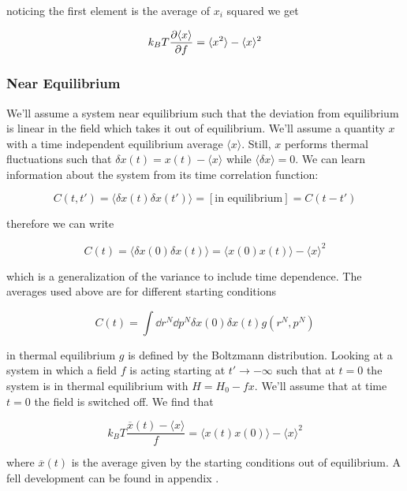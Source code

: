 noticing the first element is the average of $x_i$ squared we get

\begin{equation}
	k_BT\diffp{\langle x \rangle}{f} = \langle x^2\rangle - \langle x \rangle^2
\end{equation}

\subsubsection{Near Equilibrium}

We'll assume a system near equilibrium such that the deviation from equilibrium is linear in the field which takes it out of equilibrium. We'll assume a quantity $x$ with a time independent equilibrium average $\langle x \rangle$. Still, $x$ performs thermal fluctuations such that $\delta x(t) = x(t)-\langle x \rangle$ while $\langle \delta x \rangle = 0$. We can learn information about the system from its time correlation function:

\begin{equation}
	C(t,t') = \langle\delta x(t) \delta x(t')\rangle = [\text{in equilibrium}] = C(t-t')
\end{equation}

therefore we can write

\begin{equation}
	C(t) = \langle \delta x(0)\delta x(t) \rangle = \langle x(0)x(t)\rangle - \langle x \rangle ^2
\end{equation}

which is a generalization of the variance to include time dependence. The averages used above are for different starting conditions

\begin{equation}
	C(t) = \int \dd r^N\dd p^N \delta x(0)\delta x(t)g(r^N,p^N)
\end{equation}

in thermal equilibrium $g$ is defined by the Boltzmann distribution. Looking at a system in which a field $f$ is acting starting at $t'\rightarrow-\infty$ such that at $t=0$ the system is in thermal equilibrium with $H=H_0-fx$. We'll assume that at time $t=0$ the field is switched off. We find that

\begin{equation}
	k_BT \frac{\overline{x}(t)-\langle x \rangle}{f} = \langle x(t)x(0)\rangle -\langle x \rangle^2
\end{equation}

where $\overline{x}(t)$ is the average given by the starting conditions out of equilibrium. A fell development can be found in appendix .

